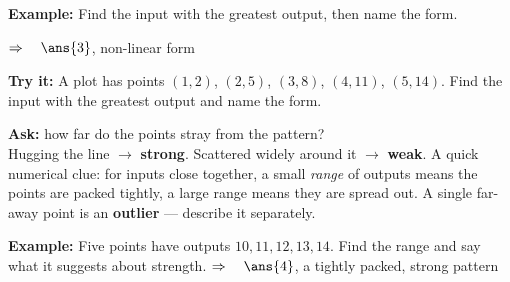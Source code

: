 \documentclass[12pt]{article}
\begin{document}
\begin{examplebox}
\textbf{Example:} \quad Find the input with the greatest output, then name the form.
\begin{center}
\end{center}
$\Rightarrow\quad \ans{3}$, non-linear form
\end{examplebox}

\begin{tryitbox}
\textbf{Try it:} \quad A plot has points $(1,2)$, $(2,5)$, $(3,8)$, $(4,11)$, $(5,14)$. Find the
input with the greatest output and name the form.\\[2pt]
\end{tryitbox}


\begin{formulabox}
\textbf{Ask:} how far do the points stray from the pattern?\\[3pt]
Hugging the line $\rightarrow$ \textbf{strong}. Scattered widely around it $\rightarrow$
\textbf{weak}. A quick numerical clue: for inputs close together, a small \textit{range} of
outputs means the points are packed tightly, a large range means they are spread out.
A single far-away point is an \textbf{outlier} --- describe it separately.
\end{formulabox}

\begin{examplebox}
\textbf{Example:} \quad Five points have outputs $10, 11, 12, 13, 14$. Find the range and say
what it suggests about strength.
$\Rightarrow\quad \ans{4}$, a tightly packed, strong pattern
\end{examplebox}
\end{document}

